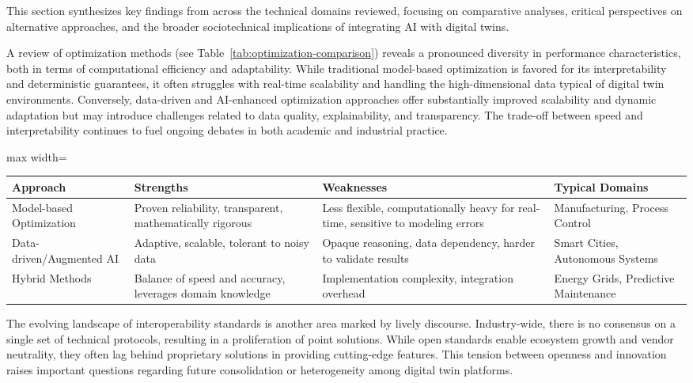 \documentclass[sigconf]{acmart}
\begin{document}
This section synthesizes key findings from across the technical domains reviewed, focusing on comparative analyses, critical perspectives on alternative approaches, and the broader sociotechnical implications of integrating AI with digital twins.

A review of optimization methods (see Table~\ref{tab:optimization-comparison}) reveals a pronounced diversity in performance characteristics, both in terms of computational efficiency and adaptability. While traditional model-based optimization is favored for its interpretability and deterministic guarantees, it often struggles with real-time scalability and handling the high-dimensional data typical of digital twin environments. Conversely, data-driven and AI-enhanced optimization approaches offer substantially improved scalability and dynamic adaptation but may introduce challenges related to data quality, explainability, and transparency. The trade-off between speed and interpretability continues to fuel ongoing debates in both academic and industrial practice.

\begin{table*}[htbp]
\centering
\caption{Comparative Summary of Optimization Approaches in AI-enabled Digital Twins}
\label{tab:optimization-comparison}
\begin{adjustbox}{max width=\textwidth}
\begin{tabular}{@{}llll@{}}
\toprule
Approach & Strengths & Weaknesses & Typical Domains \\
\midrule
Model-based Optimization & Proven reliability, transparent, mathematically rigorous & Less flexible, computationally heavy for real-time, sensitive to modeling errors & Manufacturing, Process Control \\
Data-driven/Augmented AI & Adaptive, scalable, tolerant to noisy data & Opaque reasoning, data dependency, harder to validate results & Smart Cities, Autonomous Systems \\
Hybrid Methods & Balance of speed and accuracy, leverages domain knowledge & Implementation complexity, integration overhead & Energy Grids, Predictive Maintenance \\
\bottomrule
\end{tabular}
\end{adjustbox}
\end{table*}

The evolving landscape of interoperability standards is another area marked by lively discourse. Industry-wide, there is no consensus on a single set of technical protocols, resulting in a proliferation of point solutions. While open standards enable ecosystem growth and vendor neutrality, they often lag behind proprietary solutions in providing cutting-edge features. This tension between openness and innovation raises important questions regarding future consolidation or heterogeneity among digital twin platforms.
\end{document}
